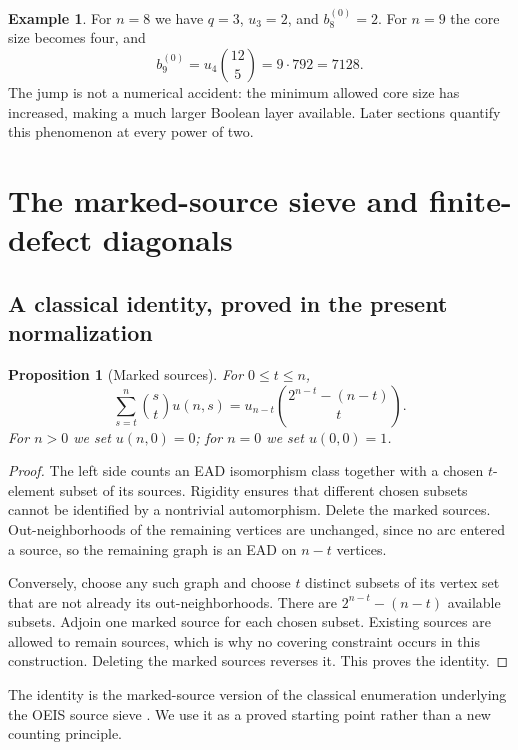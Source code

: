 \documentclass[11pt,a4paper]{article}
\newtheorem{proposition}[theorem]{Proposition}
\theoremstyle{definition}
\newtheorem{example}[theorem]{Example}
\begin{document}
\begin{example}
For $n=8$ we have $q=3$, $u_3=2$, and $b_8^{(0)}=2$.
For $n=9$ the core size becomes four, and
\[
 b_9^{(0)}=u_4\binom{12}{5}=9\cdot792=7128.
\]
The jump is not a numerical accident: the minimum allowed core size has
increased, making a much larger Boolean layer available. Later sections
quantify this phenomenon at every power of two.
\end{example}

\section{The marked-source sieve and finite-defect diagonals}

\subsection{A classical identity, proved in the present normalization}
\begin{proposition}[Marked sources]\label{sbd:prop:marked}
For $0\le t\le n$,
\begin{equation}\label{sbd:eq:marked}
 \sum_{s=t}^n\binom st u(n,s)
 =u_{n-t}\binom{2^{n-t}-(n-t)}{t}.
\end{equation}
For $n>0$ we set $u(n,0)=0$; for $n=0$ we set $u(0,0)=1$.
\end{proposition}
\begin{proof}
The left side counts an EAD isomorphism class together with a chosen
$t$-element subset of its sources. Rigidity ensures that different
chosen subsets cannot be identified by a nontrivial automorphism.
Delete the marked sources. Out-neighborhoods of the remaining vertices
are unchanged, since no arc entered a source, so the remaining graph is
an EAD on $n-t$ vertices.

Conversely, choose any such graph and choose $t$ distinct subsets of
its vertex set that are not already its out-neighborhoods. There are
$2^{n-t}-(n-t)$ available subsets. Adjoin one marked source for each
chosen subset. Existing sources are allowed to remain sources, which is
why no covering constraint occurs in this construction. Deleting the
marked sources reverses it. This proves the identity.
\end{proof}

The identity is the marked-source version of the classical enumeration
underlying the OEIS source sieve \cite{oeis162}. We use it as a proved
starting point rather than a new counting principle.
\end{document}
